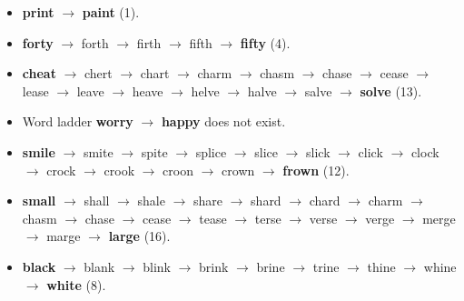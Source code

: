 \documentclass{article}
\begin{document}
\begin{itemize}
    \item \textbf{print} $\rightarrow$ \textbf{paint} (1).
    \item \textbf{forty} $\rightarrow$ forth $\rightarrow$ firth $\rightarrow$ fifth $\rightarrow$ \textbf{fifty} (4).
    \item \textbf{cheat} $\rightarrow$ chert $\rightarrow$ chart $\rightarrow$ charm $\rightarrow$ chasm $\rightarrow$ chase $\rightarrow$ cease $\rightarrow$ lease $\rightarrow$ leave $\rightarrow$ heave $\rightarrow$ helve $\rightarrow$ halve $\rightarrow$ salve $\rightarrow$ \textbf{solve} (13).
    \item Word ladder \textbf{worry} $\rightarrow$ \textbf{happy} does not exist.
    \item \textbf{smile} $\rightarrow$ smite $\rightarrow$ spite $\rightarrow$ splice $\rightarrow$ slice $\rightarrow$ slick $\rightarrow$ click $\rightarrow$ clock $\rightarrow$ crock $\rightarrow$ crook $\rightarrow$ croon $\rightarrow$ crown $\rightarrow$ \textbf{frown} (12).
    \item \textbf{small} $\rightarrow$ shall $\rightarrow$ shale $\rightarrow$ share $\rightarrow$ shard $\rightarrow$ chard $\rightarrow$ charm $\rightarrow$ chasm $\rightarrow$ chase $\rightarrow$ cease $\rightarrow$ tease $\rightarrow$ terse $\rightarrow$ verse $\rightarrow$ verge $\rightarrow$ merge $\rightarrow$ marge $\rightarrow$ \textbf{large} (16).
    \item \textbf{black} $\rightarrow$ blank $\rightarrow$ blink $\rightarrow$ brink $\rightarrow$ brine $\rightarrow$ trine $\rightarrow$ thine $\rightarrow$ whine $\rightarrow$ \textbf{white} (8).
\end{itemize}
\end{document}
